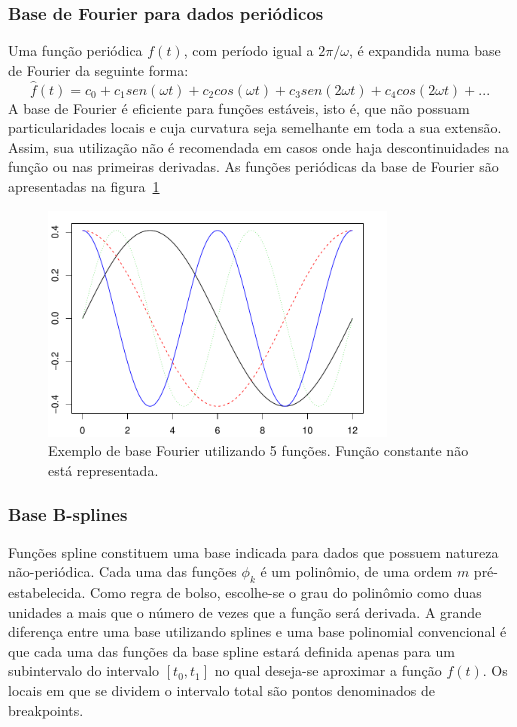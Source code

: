 \documentclass[
	12pt,				%
	openright,			%
	oneside,			%
	a4paper,			%
	english,			%
	brazil				%
	]{dissertacao-ufrgs-abntex2}
\begin{document}
\subsubsection*{Base de Fourier para dados periódicos}

Uma função periódica $f(t)$, com período igual a $2\pi/\omega$,
é expandida numa base de Fourier da seguinte forma:
\begin{equation}
\hat{f}(t)=c_{0}+c_{1}sen(\omega t)+c_{2}cos(\omega t)+c_{3}sen(2\omega t)+c_{4}cos(2\omega t)+...
\end{equation}
A base de Fourier é eficiente para funções estáveis, isto é, que não
possuam particularidades locais e cuja curvatura seja semelhante em
toda a sua extensão. Assim, sua utilização não é recomendada em casos
onde haja descontinuidades na função ou nas primeiras derivadas. As funções periódicas da base de Fourier são apresentadas na figura~\ref{fig-base-fourier}
\begin{figure}[h!] 
  \centering
    \includegraphics[width=0.8\textwidth]{anexos/base_fourier.pdf}
  \caption{Exemplo de base Fourier utilizando 5 funções. Função constante não está representada.}
  \label{fig-base-fourier}
\end{figure}

\subsubsection*{Base B-splines} \label{sub:Base-B-splines}

Funções spline constituem uma base indicada para  dados que possuem natureza não-periódica. 
Cada uma das funções $\phi_k$ é um polinômio, de uma ordem $m$ pré-estabelecida. 
Como regra de bolso, escolhe-se o grau do polinômio como duas unidades a mais que o número de vezes que a função será derivada.
A grande diferença entre uma base utilizando splines e uma base polinomial convencional é que cada uma das funções da base spline estará definida apenas para um subintervalo do intervalo $[t_0,t_1]$ no qual  deseja-se aproximar a função $f(t)$.
Os locais em que se dividem o intervalo total são pontos denominados de breakpoints.
\end{document}
